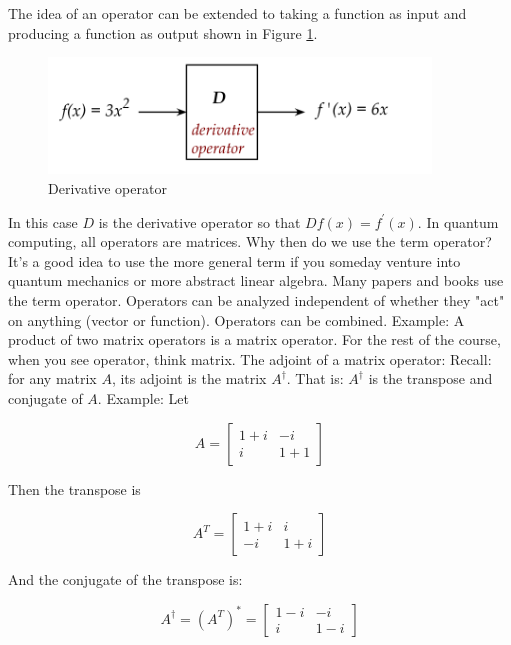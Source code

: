 \documentclass[main.tex]{subfiles}
\begin{document}
    The idea of an operator can be extended to taking a function as input and producing a function as output shown in Figure \ref{fig:16operator2}.
    
    \begin{figure}
        \centering
        \includegraphics[width=4in]{notes/figs/n04/16operator2.png}
        \caption{Derivative operator}
        \label{fig:16operator2}
    \end{figure}
    
    In this case $D$ is the derivative operator so that $D f(x)=f^{\prime}(x)$. In quantum computing, all operators are matrices. Why then do we use the term operator? It's a good idea to use the more general term if you someday venture into quantum mechanics or more abstract linear algebra. Many papers and books use the term operator. Operators can be analyzed independent of whether they "act" on anything (vector or function). Operators can be combined. Example: A product of two matrix operators is a matrix operator. For the rest of the course, when you see operator, think matrix. The adjoint of a matrix operator: Recall: for any matrix $A$, its adjoint is the matrix $A^{\dagger}$. That is: $A^{\dagger}$ is the transpose and conjugate of $A$. Example: Let
    
    $$
    A=\left[\begin{array}{cc}
    1+i & -i \\
    i & 1+1
    \end{array}\right]
    $$
    
    Then the transpose is
    
    $$
    A^{T}=\left[\begin{array}{cc}
    1+i & i \\
    -i & 1+i
    \end{array}\right]
    $$
    
    And the conjugate of the transpose is:
    
    $$
    A^{\dagger}=\left(A^{T}\right)^{*}=\left[\begin{array}{cc}
    1-i & -i \\
    i & 1-i
    \end{array}\right]
    $$
\end{document}
